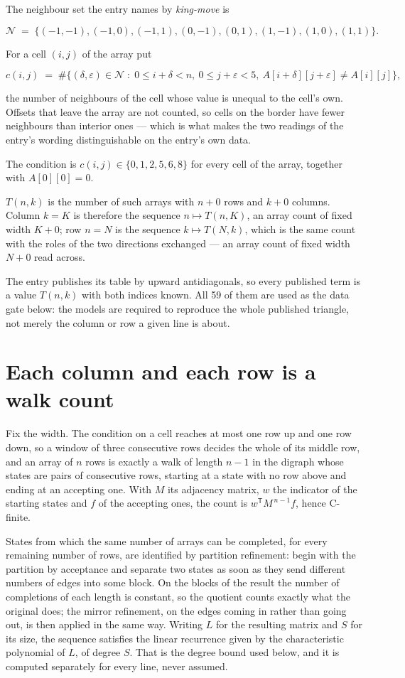 \documentclass[11pt]{article}
\theoremstyle{definition}
\begin{document}
The neighbour set the entry names by {\itshape king-move} is

\[\mathcal{N} \;=\; \{(-1,-1), (-1,0), (-1,1), (0,-1), (0,1), (1,-1), (1,0), (1,1)\}.\]

For a cell $(i,j)$ of the array put

\[c(i,j) \;=\; \#\bigl\{(\delta,\varepsilon)\in\mathcal{N} \;:\; 0\le i+\delta<n,\ 0\le j+\varepsilon<5,\ A[i+\delta][j+\varepsilon] \neq A[i][j]\bigr\},\]

the number of neighbours of the cell whose value is unequal to the cell's own. Offsets that leave the array are not counted, so cells on the border have fewer neighbours than interior ones --- which is what makes the two readings of the entry's wording distinguishable on the entry's own data.

The condition is $c(i,j) \in \{0, 1, 2, 5, 6, 8\}$ for every cell of the array, together with $A[0][0]=0$.

$T(n,k)$ is the number of such arrays with $n + 0$ rows and $k + 0$ columns. Column $k = K$ is therefore the sequence $n \mapsto T(n,K)$, an array count of fixed width $K + 0$; row $n = N$ is the sequence $k \mapsto T(N,k)$, which is the same count with the roles of the two directions exchanged --- an array count of fixed width $N + 0$ read across.

The entry publishes its table by upward antidiagonals, so every published term is a value $T(n,k)$ with both indices known. All 59 of them are used as the data gate below: the models are required to reproduce the whole published triangle, not merely the column or row a given line is about.

\section{Each column and each row is a walk count}

Fix the width. The condition on a cell reaches at most one row up and one row down, so a window of three consecutive rows decides the whole of its middle row, and an array of $n$ rows is exactly a walk of length $n-1$ in the digraph whose states are pairs of consecutive rows, starting at a state with no row above and ending at an accepting one. With $M$ its adjacency matrix, $w$ the indicator of the starting states and $f$ of the accepting ones, the count is $w^{\mathsf T}M^{\,n-1}f$, hence C-finite.

States from which the same number of arrays can be completed, for every remaining number of rows, are identified by partition refinement: begin with the partition by acceptance and separate two states as soon as they send different numbers of edges into some block. On the blocks of the result the number of completions of each length is constant, so the quotient counts exactly what the original does; the mirror refinement, on the edges coming in rather than going out, is then applied in the same way. Writing $L$ for the resulting matrix and $S$ for its size, the sequence satisfies the linear recurrence given by the characteristic polynomial of $L$, of degree $S$. That is the degree bound used below, and it is computed separately for every line, never assumed.
\end{document}
